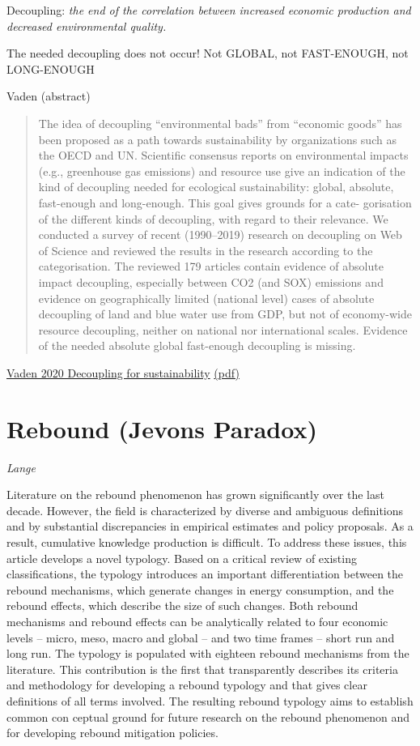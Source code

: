 \documentclass[
]{book}
\begin{document}
Decoupling: \emph{the end of the correlation between increased economic production and
decreased environmental quality.}

The needed decoupling does not occur!
Not GLOBAL, not FAST-ENOUGH, not LONG-ENOUGH

Vaden (abstract)

\begin{quote}
The idea of decoupling ``environmental bads'' from ``economic goods'' has been proposed as a path towards
sustainability by organizations such as the OECD and UN. Scientific consensus reports on environmental impacts
(e.g., greenhouse gas emissions) and resource use give an indication of the kind of decoupling needed for
ecological sustainability: global, absolute, fast-enough and long-enough. This goal gives grounds for a cate-
gorisation of the different kinds of decoupling, with regard to their relevance. We conducted a survey of recent
(1990--2019) research on decoupling on Web of Science and reviewed the results in the research according to the
categorisation. The reviewed 179 articles contain evidence of absolute impact decoupling, especially between
CO2 (and SOX) emissions and evidence on geographically limited (national level) cases of absolute decoupling of
land and blue water use from GDP, but not of economy-wide resource decoupling, neither on national nor
international scales. Evidence of the needed absolute global fast-enough decoupling is missing.
\end{quote}

\href{https://www.sciencedirect.com/science/article/pii/S1462901120304342}{Vaden 2020 Decoupling for sustainability}
\href{/pdf/Vaden_2020_Decoupling_Review.pdf}{(pdf)}

\hypertarget{rebound-jevons-paradox}{%
\section{Rebound (Jevons Paradox)}\label{rebound-jevons-paradox}}

\emph{Lange}

Literature on the rebound phenomenon has grown significantly over the last decade. However, the field is
characterized by diverse and ambiguous definitions and by substantial discrepancies in empirical estimates and
policy proposals. As a result, cumulative knowledge production is difficult. To address these issues, this article
develops a novel typology. Based on a critical review of existing classifications, the typology introduces an
important differentiation between the rebound mechanisms, which generate changes in energy consumption, and
the rebound effects, which describe the size of such changes. Both rebound mechanisms and rebound effects can
be analytically related to four economic levels -- micro, meso, macro and global -- and two time frames -- short run
and long run. The typology is populated with eighteen rebound mechanisms from the literature. This contribution
is the first that transparently describes its criteria and methodology for developing a rebound typology and that
gives clear definitions of all terms involved. The resulting rebound typology aims to establish common con­
ceptual ground for future research on the rebound phenomenon and for developing rebound mitigation policies.
\end{document}
